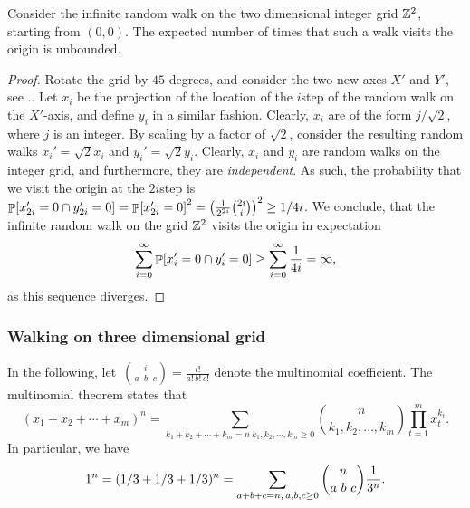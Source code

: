 \begin{lemma}
    Consider the infinite random walk on the two dimensional integer
    grid $\mathbb{Z}^2$, starting from $(0,0)$. The expected number of times
    that such a walk visits the origin is unbounded.
\end{lemma}

\begin{proof}
    Rotate the grid by $45$ degrees, and consider the two new axes
    $X'$ and $Y'$, see .. Let $x_i$ be the
    projection of the location of the $i$\th step of the random walk
    on the $X'$-axis, and define $y_i$ in a similar fashion. Clearly,
    $x_i$ are of the form $j/\sqrt{2}$, where $j$ is an integer. By
    scaling by a factor of $\sqrt{2}$, consider the resulting random
    walks $x_i' = \sqrt{2}x_i$ and $y_i' = \sqrt{2} y_i$. Clearly,
    $x_i$ and $y_i$ are random walks on the integer grid, and
    furthermore, they are \emph{independent}. As such, the probability
    that we visit the origin at the $2i$\th step is
    $\Prob{x_{2i}' = 0 \cap y_{2i}'= 0} = \Prob{x_{2i}' = 0}^2 =
    \pth{\frac{1}{2^{2i}} \binom{2i}{i}}^2 \geq 1/4i$. We conclude,
    that the infinite random walk on the grid $\mathbb{Z}^2$ visits the
    origin in expectation
    \begin{equation*}
        \sum_{i=0}^\infty \Prob{ x_i' =0 \cap y_i'=0} \geq
        \sum_{i=0}^\infty \frac{1}{4i} = \infty,
    \end{equation*}
    as this sequence diverges.
\end{proof}


\subsubsection{Walking on three dimensional grid}

In the following, let $\,\displaystyle \binom{i}{a\;\;b\;\;c} =
\frac{i!}{a! \, b!\, c!}$ denote the multinomial coefficient. The
multinomial theorem states that 
\begin{equation*}
    (x_{1}+x_{2}+\cdots +x_{m})^{n}=\sum _{k_{1}+k_{2}+\cdots +k_{m}=n\ k_{1},k_{2},\cdots ,k_{m}\geq 0}{n \choose k_{1},k_{2},\ldots ,k_{m}}\prod _{t=1}^{m}x_{t}^{k_{t}}.    
\end{equation*}
In particular, we have
\begin{equation}
    1^n =%
    (1/3 + 1/3 + 1/3)^n%
    =%
    \sum _{a + b + c=n,\, a,b,c\geq 0}{n \choose a\,\, b\,\, c}
    \frac{1}{3^n}.
    \eqlab{3:multinomial}
\end{equation}




